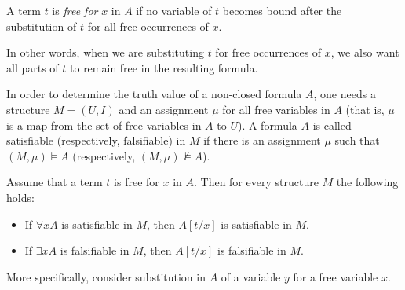 \begin{page}
\setcounter{section}{2}
\setcounter{subsection}{1}
\setcounter{dfn}{1}
\label{portion:615}

\begin{dfn}
A term $t$ is \emph{free for} $x$ in $A$ if no variable of $t$ becomes bound after the substitution of $t$ for all free occurrences of $x$.
\end{dfn}

\end{page}

\begin{page}
\setcounter{section}{2}
\setcounter{subsection}{1}
\setcounter{dfn}{1}
\label{portion:616}

In other words, when we are substituting $t$ for free occurrences of $x$,
we also want all parts of $t$ to remain free in the resulting formula.

In order to determine the truth value of a non-closed formula $A$, one needs a structure $M = (U,I)$
and an assignment $\mu$ for all free variables in $A$ (that is, $\mu$ is a map from the set of free variables in $A$ to $U$).
A formula $A$ is called satisfiable (respectively, falsifiable) in $M$
if there is an assignment $\mu$ such that $(M, \mu) \vDash A$ (respectively, $(M, \mu) \not\vDash A$).


\end{page}

\begin{page}
\setcounter{section}{2}
\setcounter{subsection}{1}
\setcounter{dfn}{2}
\label{portion:618}

\begin{lem}
\label{lem:TermSubstitute}
Assume that a term $t$ is free for $x$ in $A$.
Then for every structure $M$ the following holds:
\begin{itemize}
\item
If $\forall x A$ is satisfiable in $M$, then $A[t/x]$ is satisfiable in $M$.
\item
If $\exists x A$ is falsifiable in $M$, then $A[t/x]$ is falsifiable in $M$.
\end{itemize}
\end{lem}

\end{page}

\begin{page}
\setcounter{section}{2}
\setcounter{subsection}{1}
\setcounter{dfn}{2}
\label{portion:619}


More specifically, consider substitution in $A$ of a variable $y$ for a free variable $x$.


\end{page}

